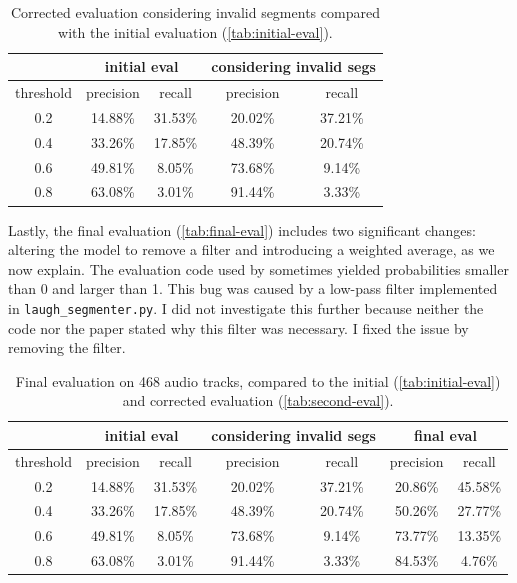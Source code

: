 \documentclass[bsc,frontabs,parskip,deptreport]{infthesis}
\begin{document}
\begin{table}[h!]
    \centering
    \begin{tabular}{|c|c|c|c|c|}
    \hline
    & \multicolumn{2}{|c|}{initial eval} & \multicolumn{2}{|c|}{considering invalid segs} \\
    \hline 
    threshold & precision & recall & precision & recall \\
    \hline
        0.2 &  14.88\% & 31.53\% & 20.02\% & 37.21\%\\ 
        0.4 &  33.26\% & 17.85\% & 48.39\% & 20.74\%\\ 
        0.6 &  49.81\% & 8.05\% & 73.68\% & 9.14\%  \\ 
        0.8 &  63.08\% & 3.01\% & 91.44\% & 3.33\%  \\ 
     \hline
    \end{tabular}
    \caption{Corrected evaluation considering invalid segments compared with the initial evaluation (\autoref{tab:initial-eval}).}
    \label{tab:second-eval}
\end{table}

Lastly, the final evaluation (\autoref{tab:final-eval}) includes two significant changes: altering the model to remove a filter and introducing a weighted average, as we now explain. 
The evaluation code used by \citet{gillick2021robust} sometimes yielded probabilities smaller than 0 and larger than 1. 
This bug was caused by a low-pass filter implemented in \verb|laugh_segmenter.py|. I did not investigate this further because neither the code nor the paper stated why this filter was necessary. I fixed the issue by removing the filter.

\begin{table}[h!]
    \centering
    \begin{tabular}{|c|c|c|c|c|c|c|}
    \hline
    & \multicolumn{2}{|c|}{initial eval} & \multicolumn{2}{|c|}{considering invalid segs} & \multicolumn{2}{|c|}{final eval}  \\
    \hline 
    threshold & precision & recall & precision & recall & precision & recall  \\
    \hline
        0.2 &  14.88\% & 31.53\% & 20.02\% & 37.21\%  & 20.86\% & 45.58\%\\
        0.4 &  33.26\% & 17.85\% & 48.39\% & 20.74\%  & 50.26\% & 27.77\%\\
        0.6 &  49.81\% & 8.05\% & 73.68\% & 9.14\%    & 73.77\% & 13.35\% \\
        0.8 &  63.08\% & 3.01\% & 91.44\% & 3.33\%    & 84.53\% & 4.76\% \\
     \hline
    \end{tabular}
    \caption{Final evaluation on 468 audio tracks, compared to the initial (\autoref{tab:initial-eval}) and corrected evaluation (\autoref{tab:second-eval}).}
    \label{tab:final-eval}
\end{table}
\end{document}

